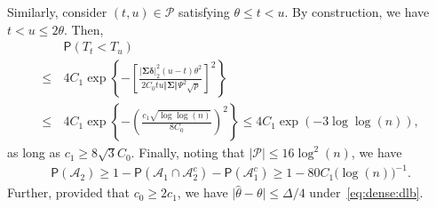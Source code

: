 \documentclass[11pt, a4paper]{article}
\newcommand{\mc}{\mathcal}
\renewcommand{\l}{\left}
\renewcommand{\r}{\right}
\def\wh{\widehat}
\newcommand{\cp}{\theta}
\newcommand{\p}{\mathsf{P}}
\newcommand{\nn}{\nonumber}
\theoremstyle{definition}
\theoremstyle{definition}
\theoremstyle{definition}
\theoremstyle{definition}
\theoremstyle{definition}
\theoremstyle{remark}
\theoremstyle{definition}
\theoremstyle{definition}
\theoremstyle{definition}
\begin{document}
Similarly, consider $(t, u) \in \mc P$ satisfying $\cp \le t < u$.
By construction, we have $t < u \le 2 \cp$.
Then,
\begin{align}
& \p\l( T_t < T_u \r)
\nn \\
\le  \,& 4 C_1 \exp\l\{ - \l[ 
\frac{\vert \bm\Sigma \bm\delta \vert_2^2 (u - t) \cp^2}{2 C_0 t u \Vert \bm\Sigma \Vert \Psi^2 \sqrt{p}}
\r]^2 \r\} %
\nn \\
\le  \,& 4 C_1 \exp\l\{ - \l( \frac{c_1 \sqrt{\log\log(n)}}{8 C_0} \r)^2 \r\} 
\le 4 C_1 \exp( - 3 \log\log(n)),
\label{eq:thm:qcscan:four}
\end{align}
as long as $c_1 \ge 8 \sqrt{3} C_0$.
Finally, noting that $\vert \mc P \vert \le 16\log^2(n)$, we have
\begin{align*}
\p(\mc A_2) \ge 1 - \p(\mc A_1 \cap \mc A_2^c) - \p(\mc A_1^c) \ge 1 - 80 C_1 \bigl(\log(n)\bigr)^{-1}.
\end{align*}
Further, provided that $c_0 \ge 2 c_1$, we have $\vert \wh\cp  - \cp \vert \le \Delta/4$ under~\eqref{eq:dense:dlb}.
\end{document}
